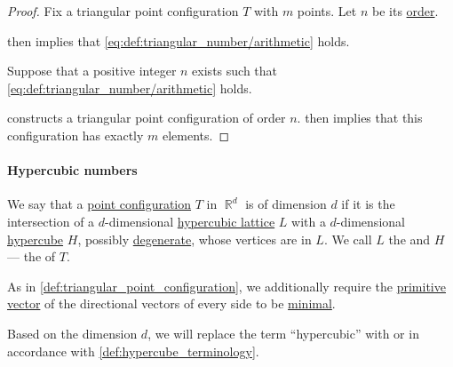 \begin{proof}
   Fix a triangular point configuration \( T \) with \( m \) points. Let \( n \) be its \hyperref[def:triangular_point_configuration_order]{order}.

   then implies that \eqref{eq:def:triangular_number/arithmetic} holds.

   Suppose that a positive integer \( n \) exists such that \eqref{eq:def:triangular_number/arithmetic} holds.

   constructs a triangular point configuration of order \( n \).  then implies that this configuration has exactly \( m \) elements.
\end{proof}

\paragraph{Hypercubic numbers}

\begin{definition}\label{def:hypercubic_point_configuration}\mimprovised
  We say that a \hyperref[def:point_configuration]{point configuration} \( T \) in \( \BbbR^d \) is  of dimension \( d \) if it is the intersection of a \( d \)-dimensional \hyperref[def:hypercubic_point_lattice]{hypercubic lattice} \( L \) with a \( d \)-dimensional \hyperref[def:hypercube]{hypercube} \( H \), possibly \hyperref[def:degenerate_polytope]{degenerate}, whose vertices are in \( L \). We call \( L \) the  and \( H \) --- the  of \( T \).

  As in \cref{def:triangular_point_configuration}, we additionally require the \hyperref[def:primitive_lattice_vector]{primitive vector} of the directional vectors of every side to be \hyperref[def:minimal_lattice_vector]{minimal}.

  Based on the dimension \( d \), we will replace the term \enquote{hypercubic} with  or  in accordance with \cref{def:hypercube_terminology}.
\end{definition}

